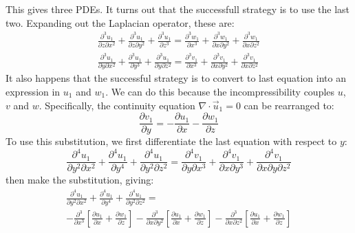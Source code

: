 \documentclass[a4paper]{report}
\begin{document}
This gives three PDEs.  It turns out that the successfull strategy is to use the last two. Expanding out the Laplacian operator, these are:
\begin{gather}
\frac{\partial^3 u_1}{\partial z \partial x^2} + \frac{\partial^3 u_1}{\partial z \partial y^2}
+ \frac{\partial^3 u_1}{\partial z^3} =
\frac{\partial^3 w_1}{\partial x^3} + \frac{\partial^3 w_1}{\partial x \partial y^2}
+ \frac{\partial^3 w_1}{\partial x \partial z^2} 
\\
\frac{\partial^3 u_1}{\partial y \partial x^2} + \frac{\partial^3 u_1}{\partial y^3}
+ \frac{\partial^3 u_1}{\partial y \partial z^2} =
\frac{\partial^3 v_1}{\partial x^3} + \frac{\partial^3 v_1}{\partial x \partial y^2}
+ \frac{\partial^3 v_1}{\partial x \partial z^2} 
\end{gather}
It also happens that the successful strategy is to convert to last equation into an expression in $u_1$ and $w_1$.  We can do this because the incompressibility couples $u$, $v$ and $w$.  Specifically, the continuity equation $\nabla \cdot \vec{u}_1 = 0$ can be rearranged to:
\begin{equation}
\frac{\partial v_1}{\partial y} = - \frac{\partial u_1}{\partial x} - \frac{\partial w_1}{\partial z}
\end{equation}
To use this substitution, we first differentiate the last equation with respect to $y$:
\begin{equation}
\frac{\partial^4 u_1}{\partial y^2 \partial x^2} + \frac{\partial^4 u_1}{\partial y^4}
+ \frac{\partial^4 u_1}{\partial y^2 \partial z^2} =
\frac{\partial^4 v_1}{\partial y \partial x^3} + \frac{\partial^4 v_1}{\partial x \partial y^3}
+ \frac{\partial^4 v_1}{\partial x \partial y \partial z^2} 
\end{equation}
then make the substitution, giving:
\begin{multline}
\frac{\partial^4 u_1}{\partial y^2 \partial x^2} + \frac{\partial^4 u_1}{\partial y^4}
+ \frac{\partial^4 u_1}{\partial y^2 \partial z^2} =  \\
- \frac{\partial^3 }{\partial x^3}
 \left[ \frac{\partial u_1}{\partial x} + \frac{\partial w_1}{\partial z} \right] 
- \frac{\partial^3 }{\partial x \partial y^2}
 \left[ \frac{\partial u_1}{\partial x} + \frac{\partial w_1}{\partial z} \right] 
- \frac{\partial^3 }{\partial x \partial z^2}
 \left[ \frac{\partial u_1}{\partial x} + \frac{\partial w_1}{\partial z} \right]  
\end{multline}
\end{document}
